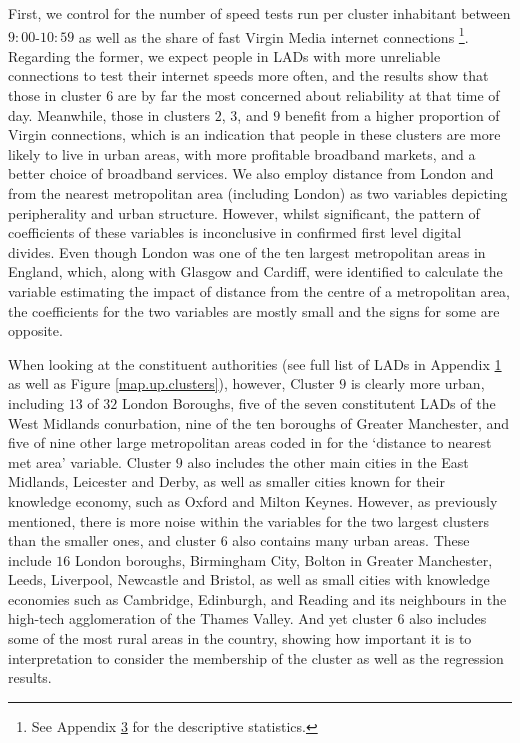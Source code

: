 \documentclass[]{interact}
\theoremstyle{plain}%
\theoremstyle{definition}
\theoremstyle{remark}
\begin{document}
First, we control for the number of speed tests run per cluster
inhabitant between \(9:00\)-\(10:59\) as well as the share of fast
Virgin Media internet connections \footnote{See Appendix
  \protect\hyperlink{appendix3}{3} for the descriptive statistics.}.
Regarding the former, we expect people in LADs with more unreliable
connections to test their internet speeds more often, and the results
show that those in cluster \(6\) are by far the most concerned about
reliability at that time of day. Meanwhile, those in clusters \(2\),
\(3\), and \(9\) benefit from a higher proportion of Virgin connections,
which is an indication that people in these clusters are more likely to
live in urban areas, with more profitable broadband markets, and a
better choice of broadband services. We also employ distance from London
and from the nearest metropolitan area (including London) as two
variables depicting peripherality and urban structure. However, whilst
significant, the pattern of coefficients of these variables is
inconclusive in confirmed first level digital divides. Even though
London was one of the ten largest metropolitan areas in England, which,
along with Glasgow and Cardiff, were identified to calculate the
variable estimating the impact of distance from the centre of a
metropolitan area, the coefficients for the two variables are mostly
small and the signs for some are opposite.

When looking at the constituent authorities (see full list of LADs in
Appendix \protect\hyperlink{appendix1}{1} as well as Figure
\ref{map.up.clusters}), however, Cluster \(9\) is clearly more urban,
including \(13\) of \(32\) London Boroughs, five of the seven
constitutent LADs of the West Midlands conurbation, nine of the ten
boroughs of Greater Manchester, and five of nine other large
metropolitan areas coded in for the `distance to nearest met area'
variable. Cluster \(9\) also includes the other main cities in the East
Midlands, Leicester and Derby, as well as smaller cities known for their
knowledge economy, such as Oxford and Milton Keynes. However, as
previously mentioned, there is more noise within the variables for the
two largest clusters than the smaller ones, and cluster \(6\) also
contains many urban areas. These include \(16\) London boroughs,
Birmingham City, Bolton in Greater Manchester, Leeds, Liverpool,
Newcastle and Bristol, as well as small cities with knowledge economies
such as Cambridge, Edinburgh, and Reading and its neighbours in the
high-tech agglomeration of the Thames Valley. And yet cluster \(6\) also
includes some of the most rural areas in the country, showing how
important it is to interpretation to consider the membership of the
cluster as well as the regression results.
\end{document}
